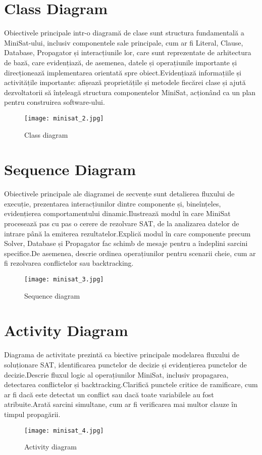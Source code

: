 \documentclass[12pt,a4paper]{report}
\begin{document}
\section{Class Diagram}
Obiectivele principale intr-o diagramă de clase sunt structura fundamentală a MiniSat-ului, inclusiv componentele sale principale, cum ar fi Literal, Clause, Database, Propagator și interacțiunile lor, care sunt reprezentate de arhitectura de bază, care evidențiază, de asemenea, datele și operațiunile importante și direcționează implementarea orientată spre obiect.Evidențiază informațiile și activitățile importante: afișează proprietățile și metodele fiecărei clase și ajută dezvoltatorii să înțeleagă structura componentelor MiniSat, acționând ca un plan pentru construirea software-ului.

\begin{figure}[h]
    \centering
    \texttt{[image: minisat\_2.jpg]}
    \caption{Class diagram}
    \label{fig:enter-label}
\end{figure}

\section{Sequence Diagram}
Obiectivele principale ale diagramei de secvențe sunt detalierea fluxului de execuție, prezentarea interacțiunilor dintre componente și, bineînțeles, evidențierea comportamentului dinamic.Ilustrează modul în care MiniSat procesează pas cu pas o cerere de rezolvare SAT, de la analizarea datelor de intrare până la emiterea rezultatelor.Explică modul în care componente precum Solver, Database și Propagator fac schimb de mesaje pentru a îndeplini sarcini specifice.De asemenea, descrie ordinea operațiunilor pentru scenarii cheie, cum ar fi rezolvarea conflictelor sau backtracking.

\begin{figure}[h]
    \centering
    \texttt{[image: minisat\_3.jpg]}
    \caption{Sequence diagram}
    \label{fig:enter-label}
\end{figure}

\section{Activity Diagram}
Diagrama de activitate prezintă ca biective principale modelarea fluxului de soluționare SAT, identificarea punctelor de decizie și evidențierea punctelor de decizie.Descrie fluxul logic al operațiunilor MiniSat, inclusiv propagarea, detectarea conflictelor și backtracking.Clarifică punctele critice de ramificare, cum ar fi dacă este detectat un conflict sau dacă toate variabilele au fost atribuite.Arată sarcini simultane, cum ar fi verificarea mai multor clauze în timpul propagării.
\begin{figure}[h]
    \centering
    \texttt{[image: minisat\_4.jpg]}
    \caption{Activity diagram}
    \label{fig:enter-label}
\end{figure}
\end{document}
